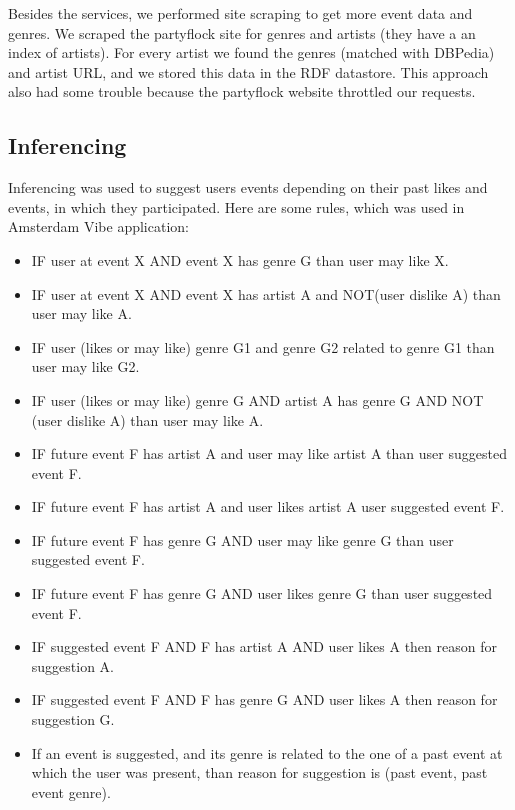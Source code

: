 \documentclass[12pt, a4paper, lithuanian]{article}
\begin{document}
Besides the services, we performed site scraping to get more event data and genres. We scraped the partyflock site for genres and artists (they have a an index of artists). For every artist we found the genres (matched with DBPedia) and artist URL, and we stored this data in the RDF datastore. This approach also had some trouble because the partyflock website throttled our requests.

\subsection{Inferencing}

Inferencing was used to suggest users events depending on their past likes and events, in which they participated. Here are some rules, which was used in Amsterdam Vibe application:

\begin{itemize}
  
    \item IF user at event X AND event X has genre G than user may like X.

    \item IF user at event X AND event X has artist A and NOT(user dislike A)  than user may like A.

    \item IF user (likes or may like) genre G1 and genre G2 related to genre G1 than user may like G2.

    \item IF user (likes or may like) genre G AND artist A has genre G AND NOT (user dislike A) than user may like A.

    \item IF future event F has artist A and user may like artist A than user suggested event F.

    \item IF future event F has artist A and user likes artist A user suggested event F.

    \item IF future event F has genre G AND user may like genre G than user suggested event F.
  
    \item IF future event F has genre G AND user likes genre G than user suggested event F.

    \item IF suggested event F AND F has artist A AND user likes A then reason for suggestion A.

    \item IF suggested event F AND F has genre G AND user likes A then reason for suggestion G.

    \item If an event is suggested, and its genre is related to the one of a past event at which the user was present,  than reason for suggestion is (past event, past event genre).

\end{itemize}
\end{document}
